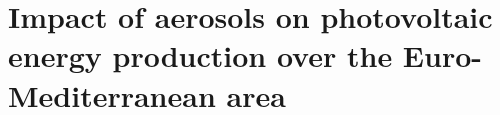 



\clearpage


\chapter[Impact of aerosols on photovoltaic production]{Impact of aerosols on photovoltaic energy production over the Euro-Mediterranean area\label{cha:impact}}

